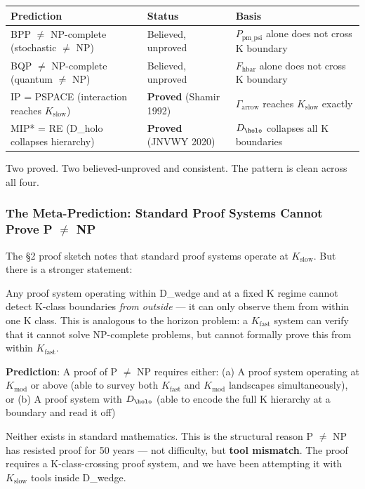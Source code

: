 \documentclass[12pt,a4paper]{article}
\newcommand{\pilcrow}{\S}
\begin{document}
\begin{table}[htbp]
\centering
\small
{}
\begin{tabularx}{\textwidth}{>{\centering\arraybackslash}X >{\centering\arraybackslash}X >{\centering\arraybackslash}X}
\toprule
\rowcolor{gray!25}\textbf{Prediction} & \textbf{Status} & \textbf{Basis} \\
\midrule
\rowcolors{1}{white}{gray!10}
BPP $\neq$ NP-complete (stochastic $\neq$ NP) & Believed, unproved & $P_{\text{pm\_psi}}$ alone does not cross K boundary \\
BQP $\neq$ NP-complete (quantum $\neq$ NP) & Believed, unproved & $F_{\text{hbar}}$ alone does not cross K boundary \\
IP = PSPACE (interaction reaches $K_{\text{slow}}$) & \textbf{Proved} (Shamir 1992) & $\Gamma_{\text{arrow}}$ reaches $K_{\text{slow}}$ exactly \\
MIP* = RE (D\_holo collapses hierarchy) & \textbf{Proved} (JNVWY 2020) & $D_{\holo}$ collapses all K boundaries \\
\bottomrule
\end{tabularx}
\end{table}

Two proved. Two believed-unproved and consistent. The pattern is clean across all four.

\subsubsection{The Meta-Prediction: Standard Proof Systems Cannot Prove P $\neq$ NP}

The \pilcrow{}2 proof sketch notes that standard proof systems operate at $K_{\text{slow}}$. But there is a stronger statement:

Any proof system operating within D\_wedge and at a fixed K regime cannot detect K-class boundaries \emph{from outside} --- it can only observe them from within one K class. This is analogous to the horizon problem: a $K_{\text{fast}}$ system can verify that it cannot solve NP-complete problems, but cannot formally prove this from within $K_{\text{fast}}$.

\textbf{Prediction}: A proof of P $\neq$ NP requires either:
(a) A proof system operating at $K_{\text{mod}}$ or above (able to survey both $K_{\text{fast}}$ and $K_{\text{mod}}$ landscapes simultaneously), or
(b) A proof system with $D_{\holo}$ (able to encode the full K hierarchy at a boundary and read it off)

Neither exists in standard mathematics. This is the structural reason P $\neq$ NP has resisted proof for 50 years --- not difficulty, but \textbf{tool mismatch}. The proof requires a K-class-crossing proof system, and we have been attempting it with $K_{\text{slow}}$ tools inside D\_wedge.
\end{document}
